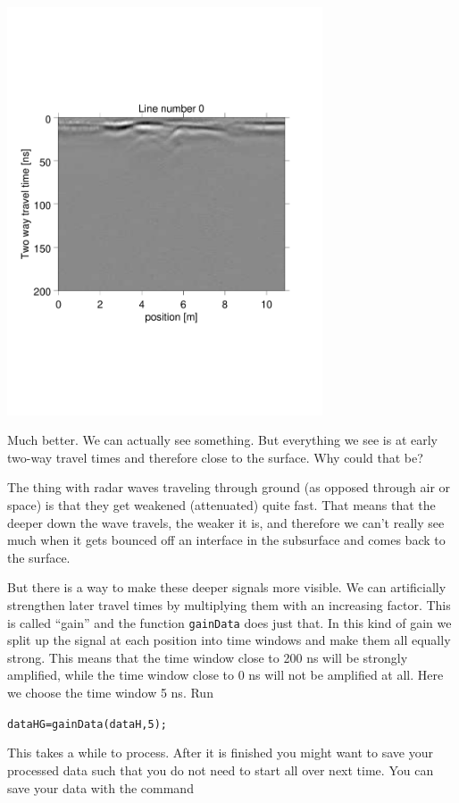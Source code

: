 \documentclass[11pt]{article}
\begin{document}
\begin{center}
\includegraphics[width=0.7\textwidth, trim = 0.9cm 6cm 2cm
  6.5cm,clip]{figures/GPRlineH0}
\end{center}
 
Much better. We can actually see something. But everything we see is
at early two-way travel times and therefore close to the surface. Why
could that be?
 
The thing with radar waves traveling through ground (as opposed
through air or space) is that they get weakened (attenuated) quite
fast. That means that the deeper down the wave travels, the weaker it
is, and therefore we can't really see much when it gets bounced off an
interface in the subsurface and comes back to the surface.
 
But there is a way to make these deeper signals more visible. We can
artificially strengthen later travel times by multiplying them with an
increasing factor. This is called ``gain'' and the function
\verb#gainData# does just that. In this kind of gain we split up the
signal at each position into time windows and make them all equally
strong. This means that the time window close to 200 ns will be
strongly amplified, while the time window close to 0 ns will not be
amplified at all. Here we choose the time window 5 ns. Run
 
\qquad \verb#dataHG=gainData(dataH,5);#
 
This takes a while to process. After it is finished you might want to
save your processed data such that you do not need to start all over
next time. You can save your data with the command
 
\end{document}
